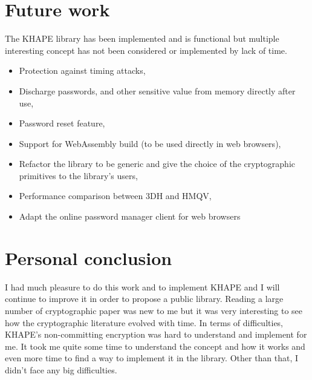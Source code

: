 ﻿\documentclass[../report.tex]{subfiles}
\begin{document}
\section{Future work}
The KHAPE library has been implemented and is functional but multiple interesting concept has not been considered or implemented by lack of time.
\begin{itemize}
 \item Protection against timing attacks,
 \item Discharge passwords, and other sensitive value from memory directly after use,
 \item Password reset feature,
 \item Support for WebAssembly build (to be used directly in web browsers),
 \item Refactor the library to be generic and give the choice of the cryptographic primitives to the library's users,
 \item Performance comparison between 3DH and HMQV,
 \item Adapt the online password manager client for web browsers
\end{itemize}


\section{Personal conclusion}
I had much pleasure to do this work and to implement KHAPE and I will continue to improve it in order to propose a public library. Reading a large number of cryptographic paper was new to me but it was very interesting to see how the cryptographic literature evolved with time.
In terms of difficulties, KHAPE's non-committing encryption was hard to understand and implement for me. It took me quite some time to understand the concept and how it works and even more time to find a way to implement it in the library.
Other than that, I didn't face any big difficulties.
\end{document}
